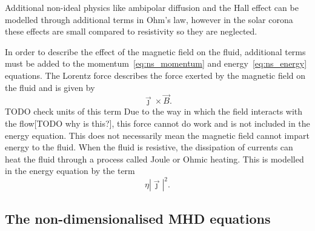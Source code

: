 Additional non-ideal physics like ambipolar diffusion and the Hall effect can be modelled through additional terms in Ohm's law, however in the solar corona these effects are small compared to resistivity so they are neglected.

In order to describe the effect of the magnetic field on the fluid, additional terms must be added to the momentum~\ref{eq:ns_momentum} and energy~\ref{eq:ns_energy} equations. The Lorentz force describes the force exerted by the magnetic field on the fluid and is given by
\begin{equation}
  \label{eq:lorentz_force}
\vec{\jmath} \times \vec{B}.
\end{equation}
TODO check units of this term
Due to the way in which the field interacts with the flow[TODO why is this?], this force cannot do work and is not included in the energy equation. This does not necessarily mean the magnetic field cannot impart energy to the fluid. When the fluid is resistive, the dissipation of currents can heat the fluid through a process called Joule or Ohmic heating. This is modelled in the energy equation by the term
\begin{equation}
\eta | \vec{\jmath} |^2.
\end{equation}

\subsection{The non-dimensionalised MHD equations}

